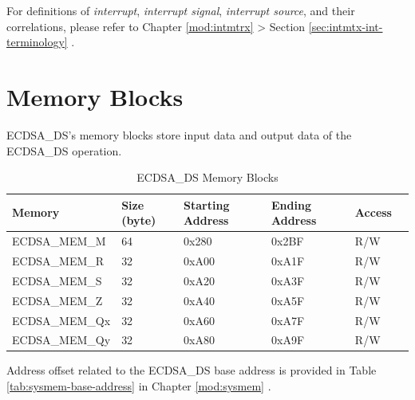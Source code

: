 \documentclass[main\_\_EN.tex]{subfiles}
\begin{document}
\begin{tiplisting}
For definitions of \textit{interrupt}, \textit{interrupt signal}, \textit{interrupt source}, and their correlations, please refer to Chapter \ref{mod:intmtrx} \textit{} > Section \ref{sec:intmtx-int-terminology} \textit{}.
\end{tiplisting}

\clearpage
\section{Memory Blocks}

ECDSA\_DS's memory blocks store input data and output data of the ECDSA\_DS operation.

\begin{table}[H]
    \centering
    \caption{ECDSA\_DS Memory Blocks} \label{tab:ecdsa-memory}
    \begin{threeparttable}
    \begin{tabular}{ | l | l | l | l | l | l | }
    \hline
        \rowcolor{lightgray}
        \textbf{Memory} & \textbf{Size (byte)}  &  \textbf{Starting Address}\tnote{*} &  \textbf{Ending Address} \tnote{*} & \textbf{Access}   \\ \hline
        ECDSA\_MEM\_M    & 64  & 0x280 & 0x2BF & R/W \\ \hline
        ECDSA\_MEM\_R    & 32  & 0xA00 & 0xA1F & R/W \\ \hline
        ECDSA\_MEM\_S    & 32  & 0xA20 & 0xA3F & R/W \\ \hline
        ECDSA\_MEM\_Z    & 32  & 0xA40 & 0xA5F & R/W \\ \hline
        ECDSA\_MEM\_Qx   & 32  & 0xA60 & 0xA7F & R/W \\ \hline
        ECDSA\_MEM\_Qy   & 32  & 0xA80 & 0xA9F & R/W \\ \hline
    \end{tabular}
    \begin{tablenotes}
        \item[*] Address offset related to the ECDSA\_DS base address is provided in Table \ref{tab:sysmem-base-address} in Chapter \ref{mod:sysmem} \textit{}.
    \end{tablenotes}
    \end{threeparttable}
\end{table}


\end{document}
